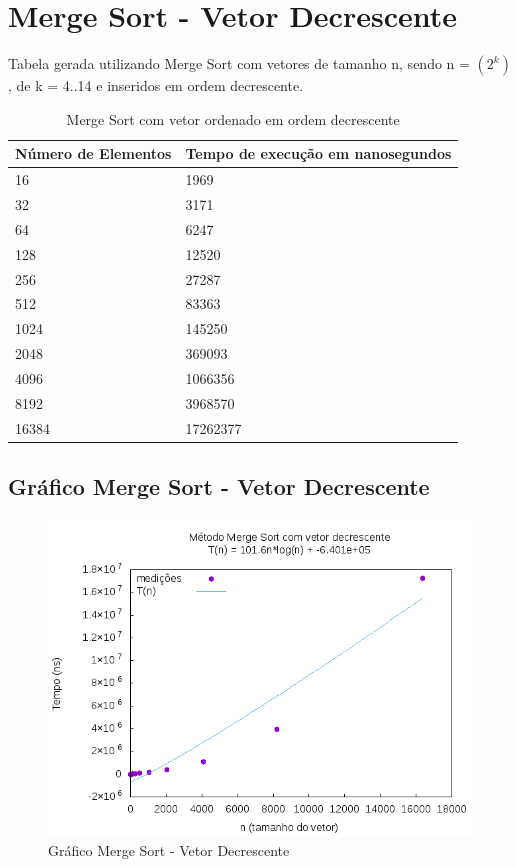 \documentclass[12pt,a4paper,twoside]{report}
\begin{document}
\section{Merge Sort - Vetor Decrescente}
Tabela gerada utilizando Merge Sort com vetores de tamanho n, sendo n = $(2^k)$, de k = 4..14 e inseridos em ordem decrescente.
\begin{table}[H]
\centering
\caption{Merge Sort com vetor ordenado em ordem decrescente}
\label{my-label}
\begin{tabular}{|l|l|}
\hline
\multicolumn{1}{|c|}{\textbf{Número de Elementos}} & \multicolumn{1}{c|}{\textbf{Tempo de execução em nanosegundos}} \\ \hline
16 & 1969 \\ \hline
32 & 3171 \\ \hline
64 & 6247 \\ \hline
128 & 12520 \\ \hline
256 & 27287 \\ \hline
512 & 83363 \\ \hline
1024 & 145250 \\ \hline
2048 & 369093 \\ \hline
4096 & 1066356 \\ \hline
8192 & 3968570 \\ \hline
16384 & 17262377 \\ \hline
\end{tabular}
\end{table}

\subsection{Gráfico Merge Sort - Vetor Decrescente}
\begin{figure}[H]
    \centering
    \includegraphics[width=0.7\linewidth]{graficos/MergeSort/vIntDecrescente/vIntDecrescente.png}
  \caption{Gráfico Merge Sort - Vetor Decrescente}
\end{figure}
\end{document}
